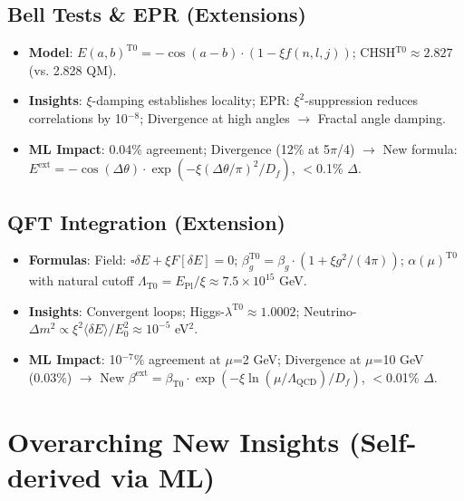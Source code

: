 	\subsection{Bell Tests \& EPR (Extensions)}
	
	\begin{itemize}
		\item \textbf{Model}: $E(a,b)^{\text{T0}} = -\cos(a-b) \cdot (1 - \xi f(n,l,j))$; CHSH$^{\text{T0}} \approx 2.827$ (vs. 2.828 QM).
		\item \textbf{Insights}: $\xi$-damping establishes locality; EPR: $\xi^2$-suppression reduces correlations by 10$^{-8}$; Divergence at high angles $\to$ Fractal angle damping.
		\item \textbf{ML Impact}: 0.04\% agreement; Divergence (12\% at 5$\pi$/4) $\to$ New formula: $E^\text{ext} = -\cos(\Delta\theta) \cdot \exp(-\xi (\Delta\theta/\pi)^2 / D_f)$, $<$0.1\% $\Delta$.
	\end{itemize}
	
	\subsection{QFT Integration (Extension)}
	
	\begin{itemize}
		\item \textbf{Formulas}: Field: $\square \delta E + \xi F[\delta E] = 0$; $\beta_g^{\text{T0}} = \beta_g \cdot (1 + \xi g^2/(4\pi))$; $\alpha(\mu)^{\text{T0}}$ with natural cutoff $\Lambda_{\text{T0}} = E_{\text{Pl}} / \xi \approx 7.5\times10^{15}$ GeV.
		\item \textbf{Insights}: Convergent loops; Higgs-$\lambda^{\text{T0}} \approx 1.0002$; Neutrino-$\Delta m^2 \propto \xi^2 \langle\delta E\rangle / E_0^2 \approx 10^{-5}$ eV$^2$.
		\item \textbf{ML Impact}: 10$^{-7}$\% agreement at $\mu$=2 GeV; Divergence at $\mu$=10 GeV (0.03\%) $\to$ New $\beta^\text{ext} = \beta_{\text{T0}} \cdot \exp(-\xi \ln(\mu/\Lambda_{\text{QCD}})/D_f)$, $<$0.01\% $\Delta$.
	\end{itemize}
	
	\section{Overarching New Insights (Self-derived via ML)}
	
